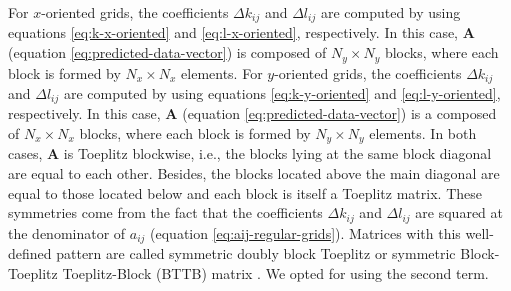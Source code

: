 \documentclass[manuscript,revised]{geophysics}
\begin{document}
For $x$-oriented grids, the coefficients $\Delta k_{ij}$ and $\Delta l_{ij}$ are 
computed by using equations \ref{eq:k-x-oriented} and \ref{eq:l-x-oriented}, respectively.
In this case, $\mathbf{A}$ (equation \ref{eq:predicted-data-vector}) is 
composed of $N_{y} \times N_{y}$ blocks, where each block is formed by $N_{x} \times N_{x}$ elements.
For $y$-oriented grids, the coefficients $\Delta k_{ij}$ and $\Delta l_{ij}$ are 
computed by using equations \ref{eq:k-y-oriented} and \ref{eq:l-y-oriented}, respectively.
In this case, $\mathbf{A}$ (equation \ref{eq:predicted-data-vector}) is a 
composed of $N_{x} \times N_{x}$ blocks, where each block is formed by $N_{y} \times N_{y}$ elements.
In both cases, $\mathbf{A}$ is Toeplitz blockwise, i.e., the blocks lying at the same block 
diagonal are equal to each other.
Besides, the blocks located above the main diagonal are equal to those 
located below and each block is itself a Toeplitz matrix.
These symmetries come from the fact that the coefficients
$\Delta k_{ij}$ and $\Delta l_{ij}$ are squared at the denominator of 
$a_{ij}$ (equation \ref{eq:aij-regular-grids}).
Matrices with this well-defined pattern are called symmetric doubly block 
Toeplitz \citep[][ p. 28]{jain1989} or symmetric Block-Toeplitz Toeplitz-Block (BTTB) 
matrix \citep[][ p. 67]{chan-jin2007}. We opted for using the second term.
\end{document}
